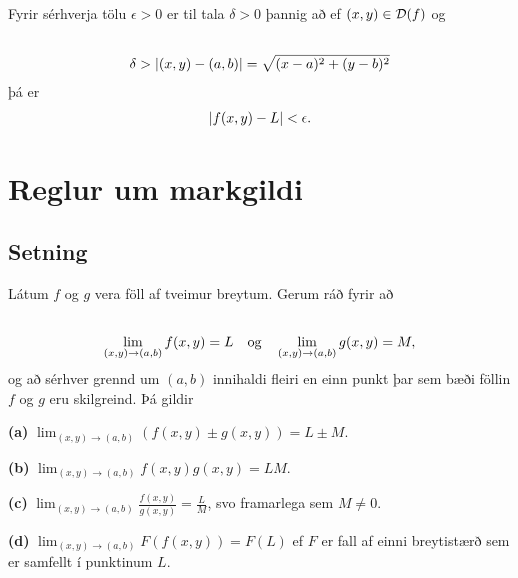 \documentclass[a4paper,10pt,icelandic]{sphinxmanual}
\begin{document}
Fyrir sérhverja tölu \(\epsilon>0\) er til tala \(\delta>0\)
þannig að ef \((x,y)\in{\cal D}(f)\) og
\begin{gather}
\begin{split}\displaystyle\end{split}\notag\\\begin{split}\delta > |(x,y)-(a,b)| = \sqrt{(x-a)^2+(y-b)^2}\end{split}\notag
\end{gather}
þá er
\begin{gather}
\begin{split}\displaystyle
|f(x,y)-L|<\epsilon.\end{split}\notag
\end{gather}

\section{Reglur um markgildi}
\label{Kafli2:reglur-um-markgildi}

\subsection{Setning}
\label{Kafli2:setning}
Látum \(f\) og \(g\) vera föll af tveimur breytum. Gerum ráð
fyrir að
\begin{gather}
\begin{split}\displaystyle\end{split}\notag\\\begin{split}\lim_{(x,y)\rightarrow (a,b)}f(x,y)=L\quad\mbox{og}\quad
\lim_{(x,y)\rightarrow (a,b)}g(x,y)=M,\end{split}\notag
\end{gather}
og að sérhver grennd um \((a,b)\) innihaldi fleiri en einn punkt þar
sem bæði föllin \(f\) og \(g\) eru skilgreind. Þá gildir

\textbf{(a)} \(\lim_{(x,y)\rightarrow (a,b)}(f(x,y)\pm g(x,y))=L\pm M\).

\textbf{(b)} \(\lim_{(x,y)\rightarrow (a,b)}f(x,y) g(x,y)=LM\).

\textbf{(c)} \(\lim_{(x,y)\rightarrow (a,b)}\frac{f(x,y)}{g(x,y)}=
\frac{L}{M}\), svo framarlega sem \(M\neq 0\).

\textbf{(d)} \(\lim_{(x,y)\rightarrow (a,b)}F(f(x,y))=F(L)\) ef \(F\)
er fall af einni breytistærð sem er samfellt í punktinum \(L\).

\end{document}
